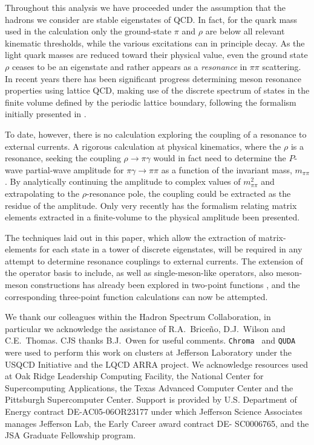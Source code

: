 \documentclass[twocolumn,amsmath,amssymb,prd,10pt,floatfix, 
superscriptaddress,nofootinbib, showpacs, preprintnumbers]{revtex4-1}
\begin{document}
Throughout this analysis we have proceeded under the assumption that the hadrons we consider are stable eigenstates of QCD. In fact, for the quark mass used in the calculation only the ground-state $\pi$ and $\rho$ are below all relevant kinematic thresholds, while the various excitations can in principle decay. As the light quark masses are reduced toward their physical value, even the ground state $\rho$ ceases to be an eigenstate and rather appears as a \emph{resonance} in $\pi\pi$ scattering. In recent years there has been significant progress determining meson resonance properties using lattice QCD, making use of the  discrete spectrum of states in the finite volume defined by the periodic lattice boundary, following the formalism initially presented in \cite{Luscher:1990ux}. 

To date, however, there is no calculation exploring the coupling of a resonance to external currents. A rigorous calculation at physical kinematics, where the $\rho$ is a resonance, seeking the coupling $\rho \to \pi \gamma$ would in fact need to determine the $P$-wave partial-wave amplitude for $\pi \gamma \to \pi \pi$ as a function of the invariant mass, $m_{\pi\pi}$. By analytically continuing the amplitude to complex values of $m^2_{\pi\pi}$ and extrapolating to the $\rho$-resonance pole, the coupling could be extracted as the residue of the amplitude. Only very recently \cite{Briceno:2014uqa} has the formalism relating matrix elements extracted in a finite-volume to the physical amplitude been presented.

The techniques laid out in this paper, which allow the extraction of matrix-elements for each state in a tower of discrete eigenstates, will be required in any attempt to determine resonance couplings to external currents. The extension of the operator basis to include, as well as single-meson-like operators, also meson-meson constructions has already been explored in two-point functions \cite{Dudek:2012gj, Dudek:2012xn, Dudek:2014qha}, and the corresponding three-point function calculations can now be attempted.




\begin{acknowledgements}
We thank our colleagues within the Hadron Spectrum Collaboration, in particular we acknowledge the assistance of R.A.~Brice\~no, D.J.~Wilson and C.E.~Thomas. CJS thanks B.J.~Owen for useful comments.  {\tt Chroma}~\cite{Edwards:2004sx} and {\tt QUDA}~\cite{Clark:2009wm,Babich:2010mu} were used to perform this work on clusters at Jefferson Laboratory under the USQCD Initiative and the LQCD ARRA project. We acknowledge resources used at Oak Ridge Leadership Computing Facility, the National Center for Supercomputing Applications, the Texas Advanced Computer Center and the Pittsburgh Supercomputer Center. Support is provided by U.S. Department of Energy contract DE-AC05-06OR23177 under which Jefferson Science Associates manages Jefferson Lab, the Early Career award contract DE- SC0006765, and the JSA Graduate Fellowship program.   
\end{acknowledgements}
\end{document}
